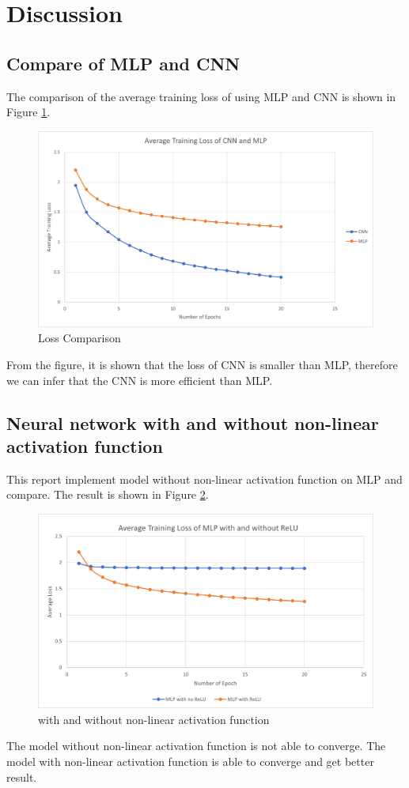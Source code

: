 \documentclass[11pt,letterpaper]{article}
\numberwithin{equation}{section}
\begin{document}
\newpage

\section{Discussion}
\subsection{Compare of MLP and CNN}
The comparison of the average training loss of using MLP and CNN is shown in Figure \ref{fig:loss}.
\begin{figure}[htbp]
    \centering
    \includegraphics[width=0.6\linewidth]{./assets/AVGLOSS.png}
    \caption{Loss Comparison}
    \label{fig:loss}
\end{figure}
From the figure, it is shown that the loss of CNN is smaller than MLP, therefore we can infer that the CNN is more efficient than MLP.


\subsection{Neural network with and without non-linear activation function}
This report implement model without non-linear activation function on MLP and compare. The result is shown in Figure \ref{fig:relu}.
\begin{figure}[htbp]
    \centering
    \includegraphics[width=0.6\linewidth]{./assets/AVGLOSSRELU.png}
    \caption{with and without non-linear activation function}
    \label{fig:relu}
\end{figure}
The model without non-linear activation function is not able to converge. The model with non-linear activation function is able to converge and get better result.
\end{document}
